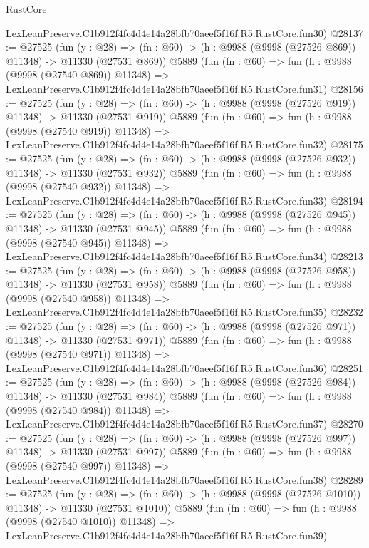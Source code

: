 \begin{lexlean}{RustCore}
\begin{coremodule}
    LexLeanPreserve.C1b912f4fc4d4e14a28bfb70aeef5f16f.R5.RustCore.fun30)
@28137 := @27525
    (fun (y : @28) =>
    (fn : @60) -> (h : @9988 (@9998 (@27526 @869)) @11348) -> @11330 (@27531 @869))
    @5889
    (fun (fn : @60) =>
    fun (h : @9988 (@9998 (@27540 @869)) @11348) =>
    LexLeanPreserve.C1b912f4fc4d4e14a28bfb70aeef5f16f.R5.RustCore.fun31)
@28156 := @27525
    (fun (y : @28) =>
    (fn : @60) -> (h : @9988 (@9998 (@27526 @919)) @11348) -> @11330 (@27531 @919))
    @5889
    (fun (fn : @60) =>
    fun (h : @9988 (@9998 (@27540 @919)) @11348) =>
    LexLeanPreserve.C1b912f4fc4d4e14a28bfb70aeef5f16f.R5.RustCore.fun32)
@28175 := @27525
    (fun (y : @28) =>
    (fn : @60) -> (h : @9988 (@9998 (@27526 @932)) @11348) -> @11330 (@27531 @932))
    @5889
    (fun (fn : @60) =>
    fun (h : @9988 (@9998 (@27540 @932)) @11348) =>
    LexLeanPreserve.C1b912f4fc4d4e14a28bfb70aeef5f16f.R5.RustCore.fun33)
@28194 := @27525
    (fun (y : @28) =>
    (fn : @60) -> (h : @9988 (@9998 (@27526 @945)) @11348) -> @11330 (@27531 @945))
    @5889
    (fun (fn : @60) =>
    fun (h : @9988 (@9998 (@27540 @945)) @11348) =>
    LexLeanPreserve.C1b912f4fc4d4e14a28bfb70aeef5f16f.R5.RustCore.fun34)
@28213 := @27525
    (fun (y : @28) =>
    (fn : @60) -> (h : @9988 (@9998 (@27526 @958)) @11348) -> @11330 (@27531 @958))
    @5889
    (fun (fn : @60) =>
    fun (h : @9988 (@9998 (@27540 @958)) @11348) =>
    LexLeanPreserve.C1b912f4fc4d4e14a28bfb70aeef5f16f.R5.RustCore.fun35)
@28232 := @27525
    (fun (y : @28) =>
    (fn : @60) -> (h : @9988 (@9998 (@27526 @971)) @11348) -> @11330 (@27531 @971))
    @5889
    (fun (fn : @60) =>
    fun (h : @9988 (@9998 (@27540 @971)) @11348) =>
    LexLeanPreserve.C1b912f4fc4d4e14a28bfb70aeef5f16f.R5.RustCore.fun36)
@28251 := @27525
    (fun (y : @28) =>
    (fn : @60) -> (h : @9988 (@9998 (@27526 @984)) @11348) -> @11330 (@27531 @984))
    @5889
    (fun (fn : @60) =>
    fun (h : @9988 (@9998 (@27540 @984)) @11348) =>
    LexLeanPreserve.C1b912f4fc4d4e14a28bfb70aeef5f16f.R5.RustCore.fun37)
@28270 := @27525
    (fun (y : @28) =>
    (fn : @60) -> (h : @9988 (@9998 (@27526 @997)) @11348) -> @11330 (@27531 @997))
    @5889
    (fun (fn : @60) =>
    fun (h : @9988 (@9998 (@27540 @997)) @11348) =>
    LexLeanPreserve.C1b912f4fc4d4e14a28bfb70aeef5f16f.R5.RustCore.fun38)
@28289 := @27525
    (fun (y : @28) =>
    (fn : @60) -> (h : @9988 (@9998 (@27526 @1010)) @11348) -> @11330 (@27531 @1010))
    @5889
    (fun (fn : @60) =>
    fun (h : @9988 (@9998 (@27540 @1010)) @11348) =>
    LexLeanPreserve.C1b912f4fc4d4e14a28bfb70aeef5f16f.R5.RustCore.fun39)

\end{coremodule}
\end{lexlean}
